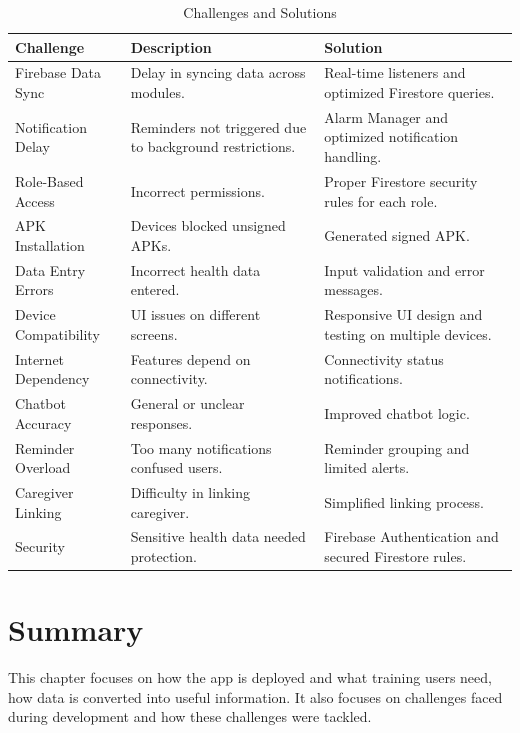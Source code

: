 \begin{table}[H]
\centering
\caption{Challenges and Solutions}
\begin{tabularx}{\textwidth}{|l|X|X|}
\hline
\textbf{Challenge} & \textbf{Description} & \textbf{Solution} \\ \hline
Firebase Data Sync & Delay in syncing data across modules. & Real-time listeners and optimized Firestore queries. \\ \hline
Notification Delay & Reminders not triggered due to background restrictions. & Alarm Manager and optimized notification handling. \\ \hline
Role-Based Access & Incorrect permissions. & Proper Firestore security rules for each role. \\ \hline
APK Installation & Devices blocked unsigned APKs. & Generated signed APK. \\ \hline
Data Entry Errors & Incorrect health data entered. & Input validation and error messages. \\ \hline
Device Compatibility & UI issues on different screens. & Responsive UI design and testing on multiple devices. \\ \hline
Internet Dependency & Features depend on connectivity. & Connectivity status notifications. \\ \hline
Chatbot Accuracy & General or unclear responses. & Improved chatbot logic. \\ \hline
Reminder Overload & Too many notifications confused users. & Reminder grouping and limited alerts. \\ \hline
Caregiver Linking & Difficulty in linking caregiver. & Simplified linking process. \\ \hline
Security & Sensitive health data needed protection. & Firebase Authentication and secured Firestore rules. \\ \hline
\end{tabularx}
\end{table}

\section{Summary}

This chapter focuses on how the app is deployed and what training users need, how data is converted into useful information. It also focuses on challenges faced during development and how these challenges were tackled.
